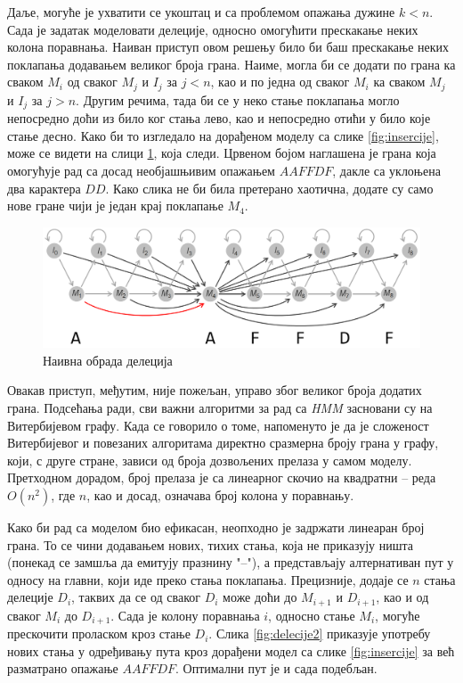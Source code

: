 \documentclass[12pt,oneside]{memoir}
\begin{document}
\begin{CJK}{UTF8}{ipxm}
Даље, могуће је ухватити се укоштац и са проблемом опажања дужине $k < n$. Сада је задатак моделовати делеције, односно омогућити прескакање неких колона поравнања. Наиван приступ овом решењу било би баш прескакање неких поклапања додавањем великог броја грана. Наиме, могла би се додати по грана ка сваком $M_i$ од сваког $M_j$ и $I_j$ за $j < n$, као и по једна од сваког $M_i$ ка сваком $M_j$ и $I_j$ за $j > n$. Другим речима, тада би се у неко стање поклапања могло непосредно доћи из било ког стања лево, као и непосредно отићи у било које стање десно. Како би то изгледало на дорађеном моделу са слике \ref{fig:insercije}, може се видети на слици \ref{fig:delecije1}, која следи. Црвеном бојом наглашена је грана која омогућује рад са досад необјашњивим опажањем $AAFFDF$, дакле са уклоњена два карактера $DD$. Како слика не би била претерано хаотична, додате су само нове гране чији је један крај поклапање $M_4$.

\begin{figure}[H]
  \centering
  \includegraphics[width=\textwidth]{delecije1.png}
  \caption{Наивна обрада делеција\cite{compeau2015}}
  \label{fig:delecije1}
\end{figure}

Овакав приступ, међутим, није пожељан, управо због великог броја додатих грана. Подсећања ради, сви важни алгоритми за рад са \textit{HMM} засновани су на Витербијевом графу. Када се говорило о томе, напоменуто је да је сложеност Витербијевог и повезаних алгоритама директно сразмерна броју грана у графу, који, с друге стране, зависи од броја дозвољених прелаза у самом моделу. Претходном дорадом, број прелаза је са линеарног скочио на квадратни -- реда $O(n^2)$, где $n$, као и досад, означава број колона у поравнању.

Како би рад са моделом био ефикасан, неопходно је задржати линеаран број грана. То се чини додавањем нових, тихих стања, која не приказују ништа (понекад се замшља да емитују празнину "--"), а представљају алтернативан пут у односу на главни, који иде преко стања поклапања. Прецизније, додаје се $n$ стања делеције $D_i$, таквих да се од сваког $D_i$ може доћи до $M_{i+1}$ и $D_{i+1}$, као и од сваког $M_i$ до $D_{i+1}$. Сада је колону поравнања $i$, односно стање $M_i$, могуће прескочити проласком кроз стање $D_i$. Слика \ref{fig:delecije2} приказује употребу нових стања у одређивању пута кроз дорађени модел са слике \ref{fig:insercije} за већ разматрано опажање $AAFFDF$. Оптимални пут је и сада подебљан.


\end{CJK}
\end{document}
